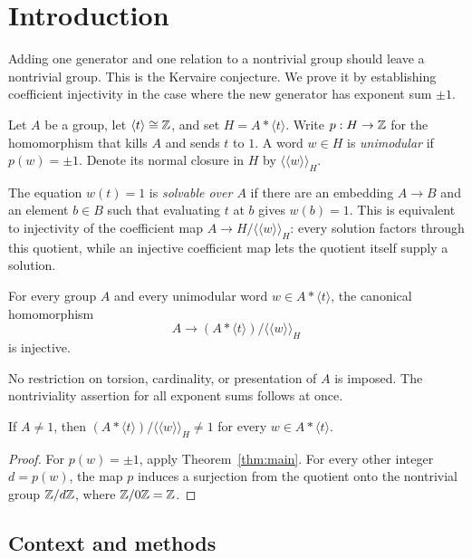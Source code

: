 \section{Introduction}

Adding one generator and one relation to a nontrivial group should leave
a nontrivial group. This is the Kervaire conjecture. We prove it by
establishing coefficient injectivity in the case where the new generator
has exponent sum $\pm1$.

Let $A$ be a group, let $\langle t\rangle\cong\mathbb Z$, and set
$H=A*\langle t\rangle$. Write $p:H\to\mathbb Z$ for the homomorphism that kills
$A$ and sends $t$ to $1$. A word $w\in H$ is \emph{unimodular} if
$p(w)=\pm1$. Denote its normal closure in $H$ by
$\langle\!\langle w\rangle\!\rangle_H$.

The equation $w(t)=1$ is \emph{solvable over $A$} if there are an
embedding $A\to B$ and an element $b\in B$ such that evaluating $t$ at
$b$ gives $w(b)=1$. This is equivalent to injectivity of the coefficient
map $A\to H/\langle\!\langle w\rangle\!\rangle_H$: every solution
factors through this quotient, while an injective coefficient map lets
the quotient itself supply a solution.

\begin{samepage}
\begin{theorem}\label{thm:main}
For every group $A$ and every unimodular word $w\in A*\langle t\rangle$,
the canonical homomorphism
\[
 A\longrightarrow (A*\langle t\rangle)/\langle\!\langle w\rangle\!\rangle_H
\]
is injective.
\end{theorem}
\end{samepage}

No restriction on torsion, cardinality, or presentation of $A$ is imposed.
The nontriviality assertion for all exponent sums follows at once.

\begin{corollary}\label{cor:kervaire}
If $A\ne1$, then
$(A*\langle t\rangle)/\langle\!\langle w\rangle\!\rangle_H\ne1$
for every $w\in A*\langle t\rangle$.
\end{corollary}
\begin{proof}
For $p(w)=\pm1$, apply Theorem~\ref{thm:main}.
For every other integer $d=p(w)$, the map $p$ induces a surjection from
the quotient onto the nontrivial group $\mathbb Z/d\mathbb Z$, where $\mathbb Z/0\mathbb Z=\mathbb Z$.
\end{proof}

\subsection{Context and methods}

